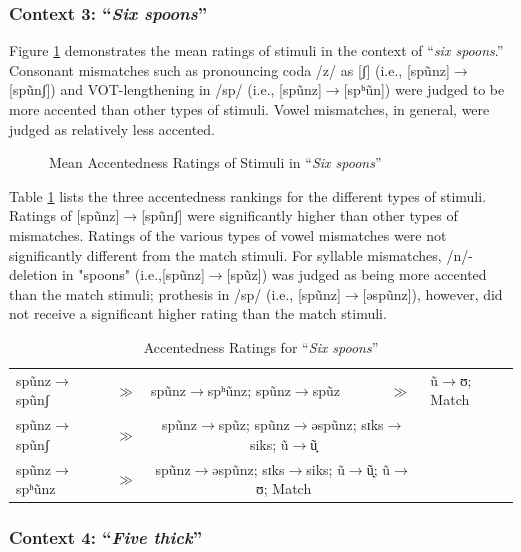 \subsubsection{Context 3: “\textit{Six spoons}”}

Figure \ref{fig:ssp1} demonstrates the mean ratings of stimuli in the context of “\textit{six spoons}.” Consonant mismatches such as pronouncing coda /z/ as [ʃ] (i.e., [spũnz]$\rightarrow$[spũnʃ]) and VOT-lengthening in /sp/ (i.e., [spũnz]$\rightarrow$[spʰũn]) were judged to be more accented than other types of stimuli. Vowel mismatches, in general, were judged as relatively less accented.

\begin{figure}[!h]
  \figSpace
\centering

\caption{Mean Accentedness Ratings of Stimuli in “\textit{Six spoons}”}
\label{fig:ssp1}
\figSpace
\end{figure}

Table \ref{table:ssp1} lists the three accentedness rankings for the different types of stimuli. Ratings of [spũnz]$\rightarrow$[spũnʃ] were significantly higher than other types of mismatches. Ratings of the various types of vowel mismatches were not significantly different from the match stimuli. For syllable mismatches, /n/-deletion in "spoons" (i.e.,[spũnz]$\rightarrow$[spũz]) was judged as being more accented than the match stimuli; prothesis in /sp/ (i.e., [spũnz]$\rightarrow$[əspũnz]), however, did not receive a significant higher rating than the match stimuli. 

\begin{table}[h]
  \figSpace
  \centering
  \caption{Accentedness Ratings for “\textit{Six spoons}” }
  \label{table:ssp1}%
    \begin{tabular}{lclcl}
    \toprule
 	spũnz$\rightarrow$spũnʃ   &$\gg$ &  spũnz$\rightarrow$spʰũnz; spũnz$\rightarrow$spũz &$\gg$ & ũ$\rightarrow$ʊ;  Match\\
	spũnz$\rightarrow$spũnʃ&$\gg$& \multicolumn{2}{c}{spũnz$\rightarrow$spũz; spũnz$\rightarrow$əspũnz; sɪks$\rightarrow$siks; ũ$\rightarrow$ũ̟}\\
	spũnz$\rightarrow$spʰũnz &$\gg$& \multicolumn{2}{c}{spũnz$\rightarrow$əspũnz; sɪks$\rightarrow$siks; ũ$\rightarrow$ũ̟; ũ$\rightarrow$ʊ; Match}\\
    \bottomrule
    \end{tabular}%
      \figSpace
\end{table}%

\subsubsection{Context 4: “\textit{Five thick}”}

